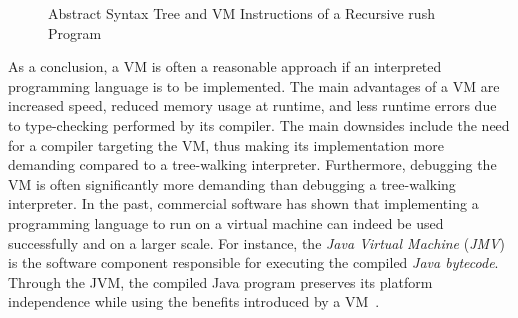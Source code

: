\begin{wrapfigure}{R}{.57\textwidth}
	\begin{adjustbox}{max totalsize={\textwidth}{!},center}
	\end{adjustbox}
	\caption{Abstract Syntax Tree and VM Instructions of a Recursive rush Program}\label{fig:tree_vs_vm_tree}
\end{wrapfigure}

As a conclusion, a VM is often a reasonable approach if an interpreted programming language is to be implemented.
The main advantages of a VM are increased speed, reduced memory usage at runtime, and less runtime errors due to type-checking performed by its compiler.
The main downsides include the need for a compiler targeting the VM, thus making its implementation more demanding compared to a tree-walking interpreter.
Furthermore, debugging the VM is often significantly more demanding than debugging a tree-walking interpreter.
In the past, commercial software has shown that implementing a programming language to run on a virtual machine can indeed be used successfully and on a larger scale.
For instance, the \emph{Java Virtual Machine} (\emph{JMV}) is the software component responsible for executing the compiled \emph{Java bytecode}.
Through the JVM, the compiled Java program preserves its platform independence while using the benefits introduced by a VM~\cite[Chapter~1.2]{Lindholm2014-jb}. %
